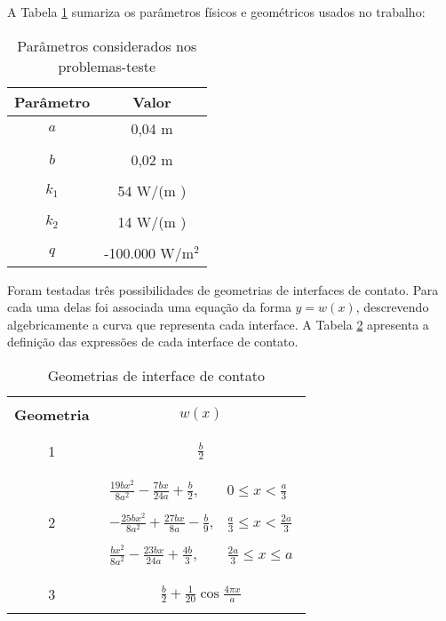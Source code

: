 A Tabela \ref{tabela_params} sumariza os parâmetros físicos e geométricos usados no trabalho:
\begin{table}[H]
\begin{center}
	\begin{tabular}{@{}cc@{}}
		\toprule
		\textbf{Parâmetro} & \textbf{Valor}    \\ \midrule
		$a$       & 0,04 m   \\ \\
		$b$       & 0,02 m     \\ \\
		$k_1$     & 54 W/(m \celsius)  \\ \\ 
		$k_2$     & 14 W/(m \celsius) \\ \\
		$q$       & -100.000 W/$\text{m}^2$ \\ \bottomrule
	\end{tabular}		
\end{center}
\caption{Parâmetros considerados nos problemas-teste}
\label{tabela_params}
\end{table}

Foram testadas três possibilidades de geometrias de interfaces de contato. Para cada uma delas foi associada uma equação da forma $y = w(x)$, descrevendo algebricamente a curva que representa cada interface. A Tabela \ref{tabela_interfaces} apresenta a definição das expressões de cada interface de contato.
\begin{table}[H]
	\begin{center}
		\begin{tabular}{c|c}
			\hline \\
			\textbf{Geometria} & $w(x)$    \\ \\ \hline \\
			1       & $\displaystyle\frac{b}{2}$   \\ \\ \hline \\
			2       & $\begin{array}{ll}
			\displaystyle\frac{19bx^2}{8a^2}-\frac{7bx}{24a}+\frac{b}{2}, & \displaystyle 0 \le x < \frac{a}{3} \\ \\
			\displaystyle -\frac{25bx^2}{8a^2}+\frac{27bx}{8a}-\frac{b}{9}, & \displaystyle \frac{a}{3} \le x < \frac{2a}{3} \\ \\
			\displaystyle \frac{bx^2}{8a^2}-\frac{23bx}{24a}+\frac{4b}{3}, & \displaystyle \frac{2a}{3} \le x \le a
			\end{array}$     \\ \\ \hline \\
			3       & $\displaystyle \frac{b}{2} + \frac{1}{20} \cos\frac{4 \pi  x}{a}$ \\ \\ \hline
		\end{tabular}		
	\end{center}
	\caption{Geometrias de interface de contato}
	\label{tabela_interfaces}
\end{table}

